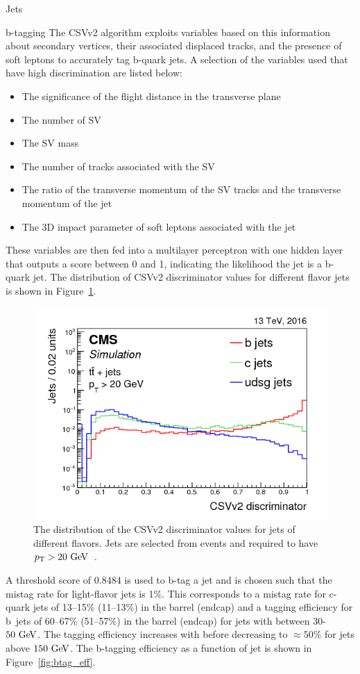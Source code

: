 \begin{section}{Jets}
\begin{subsection}{b-tagging}
The CSVv2 algorithm exploits variables based on this information about secondary vertices, their associated displaced tracks, and the presence of soft leptons to accurately tag b-quark jets.
A selection of the variables used that have high discrimination are listed below:

\begin{itemize}
\item The significance of the flight distance in the transverse plane
\item The number of SV
\item The SV mass
\item The number of tracks associated with the SV
\item The ratio of the transverse momentum of the SV tracks and the transverse momentum of the jet
\item The 3D impact parameter of soft leptons associated with the jet
\end{itemize}

These variables are then fed into a multilayer perceptron with one hidden layer that outputs a score between 0 and 1, indicating the likelihood the jet is a b-quark jet.
The distribution of CSVv2 discriminator values for different flavor jets is shown in Figure~\ref{fig:csv_discriminator}.

\begin{figure}[tbp!]
\centering
\includegraphics[angle=0,width=0.80\columnwidth]{fig/csv_discriminator.png}
\caption{The distribution of the CSVv2 discriminator values for jets of different flavors.
Jets are selected from \ttbar events and required to have $p_{\mathrm{T}} > 20~\mathrm{Ge\kern -0.1em V}$~\cite{Sirunyan:2017ezt}.}
\label{fig:csv_discriminator}
\end{figure}

A threshold score of 0.8484 is used to b-tag a jet and is chosen such that the mistag rate for light-flavor jets is 1\%.
This corresponds to a mistag rate for c-quark jets of 13--15\% (11--13\%) in the barrel (endcap) and a tagging efficiency for b~jets of 60--67\% (51--57\%) in the barrel (endcap) for jets with \pT between $30$-$50~\mathrm{Ge\kern -0.1em V}$.
The tagging efficiency increases with \pT before decreasing to $\approx 50\%$ for jets above $150~\mathrm{Ge\kern -0.1em V}$.
The b-tagging efficiency as a function of jet \pT is shown in Figure~\ref{fig:btag_eff}.


\end{subsection}
\end{section}
